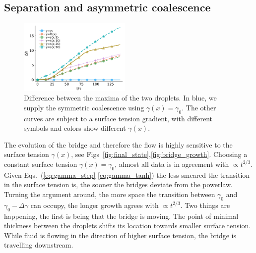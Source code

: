 \documentclass[twocolumn,amsmath,amssymb,showpacs,pre,nofootinbib,superscriptaddress]{revtex4-1} %
\begin{document}
\subsection{Separation and asymmetric coalescence}\label{subsec:separation}
\begin{figure}
    \centering
    \includegraphics[width=0.48\textwidth]{Figures/hdiff.pdf}
    \caption{Difference between the maxima of the two droplets.
    In blue, we supply the symmetric coalescence using $\gamma(x) = \gamma_0$.
    The other curves are subject to a surface tension gradient, with different symbols and colors show different $\gamma(x)$.
    }
    \label{fig:drop_diff}
\end{figure}
The evolution of the bridge and therefore the flow is highly sensitive to the surface tension $\gamma(x)$, see Figs~\ref{fig:final_state},\ref{fig:bridge_growth}.
Choosing a constant surface tension $\gamma(x) = \gamma_0$, almost all data is in agreement with $\propto t^{2/3}$.
Given Eqs.~(\ref{eq:gamma_step}-\ref{eq:gamma_tanh}) the less smeared the transition in the surface tension is, the sooner the bridges deviate from the powerlaw.
Turning the argument around, the more space the transition between $\gamma_0$ and $\gamma_0-\Delta\gamma$ can occupy, the longer growth agrees with $\propto t^{2/3}$.
Two things are happening, the first is being that the bridge is moving.
The point of minimal thickness between the droplets shifts its location towards smaller surface tension.
While fluid is flowing in the direction of higher surface tension, the bridge is travelling downstream.
\end{document}
